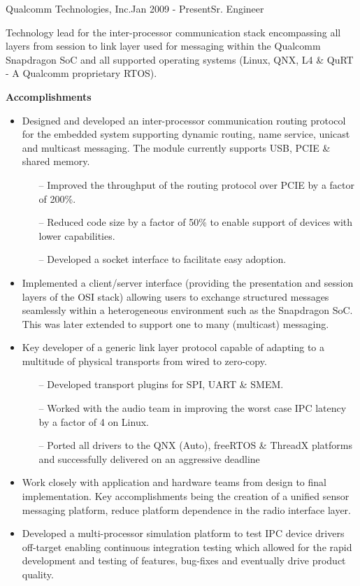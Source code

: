 \begin{rSubsection}{Qualcomm Technologies, Inc.}{Jan 2009 - Present}{Sr. Engineer}{}
  \item[] Technology lead for the inter-processor communication stack encompassing all layers from session to link layer used for messaging within the Qualcomm Snapdragon SoC and all supported operating systems (Linux, QNX, L4 \& QuRT - A Qualcomm proprietary RTOS).
  \item[]
  \item[] \textbf{Accomplishments}
  \begin{itemize}
    \item Designed and developed an inter-processor communication routing protocol for the embedded system supporting dynamic routing, name service, unicast and multicast messaging. The module currently supports USB, PCIE \& shared memory.
    \begin{itemize}
      \item[--] Improved the throughput of the routing protocol over PCIE by a factor of 200\%.
      \item[--] Reduced code size by a factor of 50\% to enable support of devices with lower capabilities.
      \item[--] Developed a socket interface to facilitate easy adoption.
    \end{itemize}
    \item Implemented a client/server interface (providing the presentation and session layers of the OSI stack) allowing users to exchange structured messages seamlessly within a heterogeneous environment such as the Snapdragon SoC. This was later extended to support one to many (multicast) messaging.
    \item Key developer of a generic link layer protocol capable of adapting to a multitude of physical transports from wired to zero-copy.
    \begin{itemize}
      \item[--] Developed transport plugins for SPI, UART \& SMEM.
      \item[--] Worked with the audio team in improving the worst case IPC latency by a factor of 4 on Linux.
      \item[--] Ported all drivers to the QNX (Auto), freeRTOS \& ThreadX platforms and successfully delivered on an aggressive deadline
    \end{itemize}
    \item Work closely with application and hardware teams from design to final implementation. Key accomplishments being the creation of a unified sensor messaging platform, reduce platform dependence in the radio interface layer.
    \item Developed a multi-processor simulation platform to test IPC device drivers off-target enabling continuous integration testing which allowed for the rapid development and testing of features, bug-fixes and eventually drive product quality.
  \end{itemize}
\end{rSubsection}

